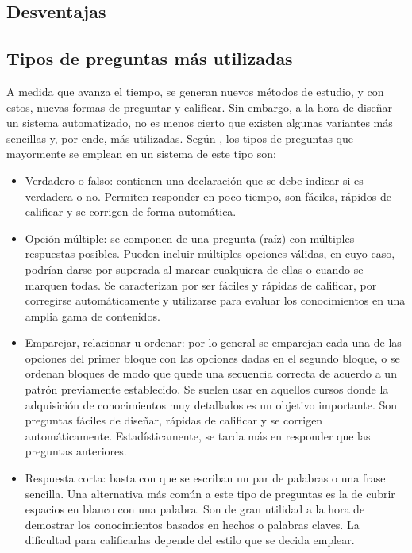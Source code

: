 \subsection{Desventajas}

\subsection{Tipos de preguntas más utilizadas}
A medida que avanza el tiempo, se generan nuevos métodos de estudio, y con estos, nuevas formas de preguntar y calificar. Sin embargo, a la hora de diseñar un sistema automatizado, no es menos cierto que existen algunas variantes más sencillas y, por ende, más utilizadas. Según \cite{Catadores}, los tipos de preguntas que mayormente se emplean en un sistema de este tipo son:

\begin{itemize}
\item Verdadero o falso: contienen una declaración que se debe indicar si es verdadera o no. Permiten responder en poco tiempo, son fáciles, rápidos de calificar y se corrigen de forma automática.
\item Opción múltiple: se componen de una pregunta (raíz) con múltiples respuestas posibles. Pueden incluir múltiples opciones válidas, en cuyo caso, podrían darse por superada al marcar cualquiera de ellas o cuando se marquen todas. Se caracterizan por ser fáciles y rápidas de calificar, por corregirse automáticamente y utilizarse para evaluar los conocimientos en una amplia gama de contenidos.
\item Emparejar, relacionar u ordenar: por lo general se emparejan cada una de las opciones del primer bloque con las opciones dadas en el segundo bloque, o se ordenan bloques de modo que quede una secuencia correcta de acuerdo a un patrón previamente establecido. Se suelen usar en aquellos cursos donde la adquisición de conocimientos muy detallados es un objetivo importante. Son preguntas fáciles de diseñar, rápidas de calificar y se corrigen automáticamente. Estadísticamente, se tarda más en responder que las preguntas anteriores.
\item Respuesta corta: basta con que se escriban un par de palabras o una frase sencilla. Una alternativa más común a este tipo de preguntas es la de cubrir espacios en blanco con una palabra. Son de gran utilidad a la hora de demostrar los conocimientos basados en hechos o palabras claves. La dificultad para calificarlas depende del estilo que se decida emplear.
\end{itemize}

